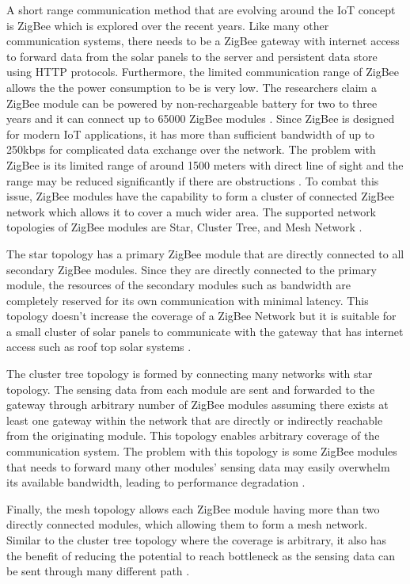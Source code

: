 \documentclass[../thesis.tex]{subfiles}
\begin{document}
A short range communication method that are evolving around the IoT concept is ZigBee which is explored over the recent years. Like many other communication systems, there needs to be a ZigBee gateway with internet access to forward data from the solar panels to the server and persistent data store using HTTP protocols. Furthermore, the limited communication range of ZigBee allows the the power consumption to be is very low. The researchers claim a ZigBee module can be powered by non-rechargeable battery for two to three years and it can connect up to 65000 ZigBee modules \cite{SHARIFF20151730}. Since ZigBee is designed for modern IoT applications, it has more than sufficient bandwidth of up to 250kbps for complicated data exchange over the network. The problem with ZigBee is its limited range of around 1500 meters with direct line of sight and the range may be reduced significantly if there are obstructions \cite{SHARIFF20151730}. To combat this issue, ZigBee modules have the capability to form a cluster of connected ZigBee network which allows it to cover a much wider area. The supported network topologies of ZigBee modules are Star, Cluster Tree, and Mesh Network \cite{SHARIFF20151730}.

The star topology has a primary ZigBee module that are directly connected to all secondary ZigBee modules. Since they are directly connected to the primary module, the resources of the secondary modules such as bandwidth are completely reserved for its own communication with minimal latency. This topology doesn't increase the coverage of a ZigBee Network but it is suitable for a small cluster of solar panels to communicate with the gateway that has internet access such as roof top solar systems \cite{SHARIFF20151730}.

The cluster tree topology is formed by connecting many networks with star topology. The sensing data from each module are sent and forwarded to the gateway through arbitrary number of ZigBee modules assuming there exists at least one gateway within the network that are directly or indirectly reachable from the originating module. This topology enables arbitrary coverage of the communication system. The problem with this topology is some ZigBee modules that needs to forward many other modules' sensing data may easily overwhelm its available bandwidth, leading to performance degradation \cite{SHARIFF20151730}.

Finally, the mesh topology allows each ZigBee module having more than two directly connected modules, which allowing them to form a mesh network. Similar to the cluster tree topology where the coverage is arbitrary, it also has the benefit of reducing the potential to reach bottleneck as the sensing data can be sent through many different path \cite{SHARIFF20151730}. 
\end{document}
